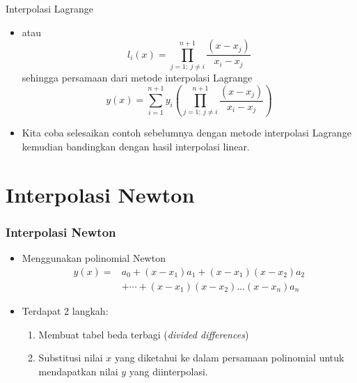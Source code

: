 \documentclass[pdflatex,compress]{beamer}
\begin{document}
\begin{frame}{Interpolasi Lagrange}
	\begin{itemize}
		\item atau
		\begin{equation*}
			l_i(x) = \prod\limits_{j = 1;~j \neq i}^{n+1} \frac{(x - x_j)}{x_i - x_j}
		\end{equation*}
		sehingga persamaan dari metode interpolasi Lagrange
		\begin{equation*}
			y(x) = \sum\limits_{i=1}^{n+1}y_i \left( \prod\limits_{j = 1;~j \neq i}^{n+1} \frac{(x - x_j)}{x_i - x_j} \right)
		\end{equation*}
		\item Kita coba selesaikan contoh sebelumnya dengan metode interpolasi Lagrange kemudian bandingkan dengan hasil interpolasi linear.
	\end{itemize}
\end{frame}

\section{Interpolasi Newton}

\begin{frame}
	\frametitle{Interpolasi Newton}
	\begin{itemize}
		\item Menggunakan polinomial Newton
		\begin{align*}
			y(x) =& a_0 + (x - x_1)a_1 + (x - x_1)(x - x_2)a_2 \\
			&+ \cdots + (x - x_1)(x - x_2) \dots (x - x_n)a_n
		\end{align*}
		\item Terdapat 2 langkah:
		\begin{enumerate}
			\item Membuat tabel beda terbagi (\textit{divided differences})
			\item Substitusi nilai $ x $ yang diketahui ke dalam persamaan polinomial untuk mendapatkan nilai $ y $ yang diinterpolasi.
		\end{enumerate}
	\end{itemize}
\end{frame}
\end{document}
